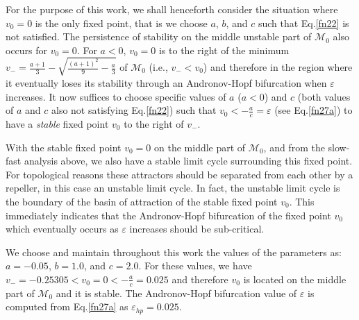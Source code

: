For the purpose of this work, we shall henceforth consider the
situation where $v_0=0$ is the only fixed point, that is we choose
$a$, $b$, and $c$ such that Eq.\eqref{fn22} is not satisfied. The
persistence of stability on the middle unstable part of $\mathcal{M}_0$
also occurs for $v_0=0$. For $a<0$, $v_0=0$ is to the right of the
minimum $v_-=\frac{a+1}{3} - \sqrt{\frac{(a+1)^2}{9}
-\frac{a}{3}}$ of $\mathcal{M}_0$ (i.e., $v_-<v_0$) and therefore in the region
where it eventually loses its stability through an Andronov-Hopf
bifurcation when $\varepsilon$ increases. It
now suffices to choose specific values of $a$ ($a<0$) and $c$ 
(both values of $a$ and $c$ also not satisfying Eq.\eqref{fn22}) such
that $v_0<-\frac{a}{c}=\varepsilon$ (see Eq.\eqref{fn27a}) to have a \textit{stable} fixed point
$v_0$ to the right of $v_-$.

With the stable fixed point $v_0=0$ on
the middle part of $\mathcal{M}_0$, and from the slow-fast
analysis above, we also have a stable limit cycle surrounding this fixed point.
For topological reasons these attractors should be separated from each 
other by a repeller, in this case an
unstable limit cycle. In fact, the unstable limit cycle is the boundary of the
basin of attraction of the stable fixed point $v_0$. This immediately indicates that
the Andronov-Hopf bifurcation of the fixed point $v_0$ which eventually occurs as
$\varepsilon$ increases should be sub-critical.

We choose and maintain throughout this work the values of the
parameters as: $a=-0.05$, $b=1.0$, and $c=2.0$. For these values, we have
$v_-=-0.25305<v_0=0<-\frac{a}{c}=0.025$ and therefore $v_0$ is located on the middle
part of $\mathcal{M}_0$ and it is stable. The Andronov-Hopf
bifurcation value of $\varepsilon$ is computed from Eq.\eqref{fn27a} as
$\varepsilon_{hp}=0.025$. 

